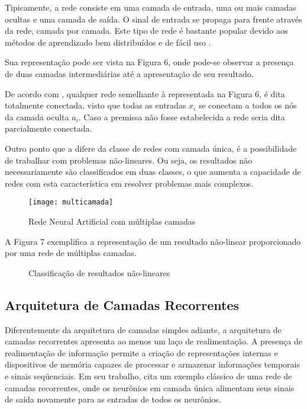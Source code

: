 Tipicamente, a rede consiste em uma camada de entrada, uma ou mais camadas ocultas e uma camada de saída. O sinal de entrada se propaga para frente através da rede, camada por camada. Este tipo de rede é bastante popular devido aos métodos de aprendizado bem distribuídos e de fácil uso \cite{haykin2000}.

Sua representação pode ser vista na Figura 6, onde pode-se observar a presença de duas camadas intermediárias até a apresentação de seu resultado.

De acordo com , qualquer rede semelhante à representada na Figura 6, é dita totalmente conectada, visto que todas as entradas $x_i$ se conectam a todos os nós da camada oculta $a_i$. Caso a premissa não fosse estabelecida a rede seria dita parcialmente conectada.

Outro ponto que a difere da classe de redes com camada única, é a possibilidade de trabalhar com problemas não-lineares. Ou seja, os resultados não necessariamente são classificados em duas classes, o que aumenta a capacidade de redes com esta característica em resolver problemas mais complexos.

\begin{figure}[h]
	\centering
	\texttt{[image: multicamada]}
	\caption{Rede Neural Artificial com múltiplas camadas}
	\label{fig-multiplas-camadas}
\end{figure}

A Figura 7 exemplifica a representação de um resultado não-linear proporcionado por uma rede de múltiplas camadas.

\begin{figure}[h]
	\centering
	\caption{Classificação de resultados não-lineares}
	\label{exec-nao-linear-imagem}
\end{figure}

\subsection{Arquitetura de Camadas Recorrentes}
Diferentemente da arquitetura de camadas simples adiante, a arquitetura de camadas recorrentes apresenta ao menos um laço de realimentação. A presença de realimentação de informação permite a criação de representações internas e dispositivos de memória capazes de processar e armazenar informações temporais e sinais seqüenciais. Em seu trabalho,  cita um exemplo clássico de uma rede de camadas recorrentes, onde os neurônios em camada única alimentam seus sinais de saída novamente para as entradas de todos os neurônios.

